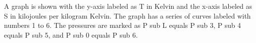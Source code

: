 A graph is shown with the y-axis labeled as T in Kelvin and the x-axis labeled as S in kilojoules per kilogram Kelvin. The graph has a series of curves labeled with numbers 1 to 6. The pressures are marked as P sub L equals P sub 3, P sub 4 equals P sub 5, and P sub 0 equals P sub 6.